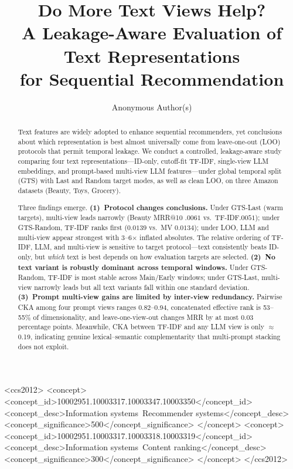 \documentclass[sigconf,natbib=true,anonymous]{acmart}
\newcommand{\tfidf}{\textsc{TF-IDF}\xspace}
\newcommand{\llm}{\textsc{LLM}\xspace}
\begin{document}
\title{Do More Text Views Help?\\
A Leakage-Aware Evaluation of Text Representations\\
for Sequential Recommendation}

\author{Anonymous Author(s)}
\renewcommand{\shortauthors}{Anonymous}

\begin{abstract}
Text features are widely adopted to enhance sequential recommenders, yet conclusions about which representation is best almost universally come from leave-one-out (LOO) protocols that permit temporal leakage.
We conduct a controlled, leakage-aware study comparing four text representations---ID-only, cutoff-fit \tfidf, single-view \llm embeddings, and prompt-based multi-view \llm features---under global temporal split (GTS) with Last and Random target modes, as well as clean LOO, on three Amazon datasets (Beauty, Toys, Grocery).

Three findings emerge.
\textbf{(1)~Protocol changes conclusions.}
Under GTS-Last (warm targets), multi-view leads narrowly (Beauty MRR@10 $.0061$ vs.\ \tfidf $.0051$); under GTS-Random, \tfidf ranks first ($0.0139$ vs.\ MV $0.0134$); under LOO, \llm and multi-view appear strongest with 3--6$\times$ inflated absolutes.
The relative ordering of \tfidf, \llm, and multi-view is sensitive to target protocol---text consistently beats ID-only, but \emph{which} text is best depends on how evaluation targets are selected.
\textbf{(2)~No text variant is robustly dominant across temporal windows.}
Under GTS-Random, \tfidf is most stable across Main/Early windows; under GTS-Last, multi-view narrowly leads but all text variants fall within one standard deviation.
\textbf{(3)~Prompt multi-view gains are limited by inter-view redundancy.}
Pairwise CKA among four prompt views ranges 0.82--0.94, concatenated effective rank is 53--55\% of dimensionality, and leave-one-view-out changes MRR by at most 0.03 percentage points.
Meanwhile, CKA between \tfidf and any \llm view is only $\approx$0.19, indicating genuine lexical--semantic complementarity that multi-prompt stacking does not exploit.
\end{abstract}

\begin{CCSXML}
<ccs2012>
 <concept>
  <concept_id>10002951.10003317.10003347.10003350</concept_id>
  <concept_desc>Information systems~Recommender systems</concept_desc>
  <concept_significance>500</concept_significance>
 </concept>
 <concept>
  <concept_id>10002951.10003317.10003318.10003319</concept_id>
  <concept_desc>Information systems~Content ranking</concept_desc>
  <concept_significance>300</concept_significance>
 </concept>
</ccs2012>
\end{CCSXML}
\end{document}
